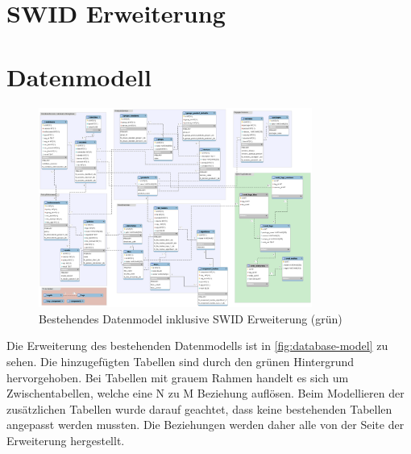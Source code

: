 \section{SWID Erweiterung}
\label{swiderweiterung}
\section{Datenmodell}
\begin{figure}[H]
\centering
\includegraphics[angle=90,width=0.8\textwidth]{./images/db/database-model}
\caption{Bestehendes Datenmodel inklusive SWID Erweiterung (grün)}
\label{fig:database-model}
\end{figure}
Die Erweiterung des bestehenden Datenmodells ist in \autoref{fig:database-model}
zu sehen. Die hinzugefügten Tabellen sind durch den grünen Hintergrund
hervorgehoben. Bei Tabellen mit grauem Rahmen handelt es sich um
Zwischentabellen, welche eine N zu M Beziehung auflösen. Beim Modellieren der
zusätzlichen Tabellen wurde darauf geachtet, dass keine bestehenden Tabellen
angepasst werden mussten. Die Beziehungen werden daher alle von der Seite der
Erweiterung hergestellt.

